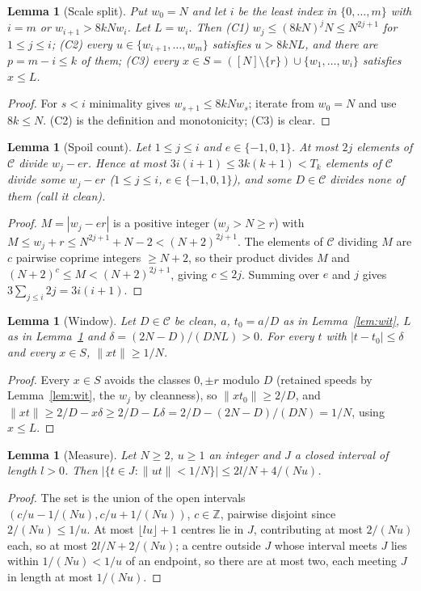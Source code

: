 \documentclass[11pt]{article}
\newtheorem{lemma}[theorem]{Lemma}
\theoremstyle{definition}
\theoremstyle{remark}
\newcommand{\nd}[1]{\lVert #1\rVert}
\newcommand{\ZZ}{\mathbb{Z}}
\begin{document}
\begin{lemma}[Scale split]\label{lem:C}
Put $w_0=N$ and let $i$ be the least index in $\{0,\dots,m\}$ with $i=m$ or $w_{i+1}>8kNw_i$. Let $L=w_i$. Then (C1) $w_j\le(8kN)^jN\le N^{2j+1}$ for $1\le j\le i$; (C2) every $u\in\{w_{i+1},\dots,w_m\}$ satisfies $u>8kNL$, and there are $p=m-i\le k$ of them; (C3) every $x\in S=([N]\setminus\{r\})\cup\{w_1,\dots,w_i\}$ satisfies $x\le L$.
\end{lemma}
\begin{proof}
For $s<i$ minimality gives $w_{s+1}\le8kNw_s$; iterate from $w_0=N$ and use $8k\le N$. (C2) is the definition and monotonicity; (C3) is clear.
\end{proof}

\begin{lemma}[Spoil count]\label{lem:S}
Let $1\le j\le i$ and $e\in\{-1,0,1\}$. At most $2j$ elements of $\mathcal C$ divide $w_j-er$. Hence at most $3i(i+1)\le3k(k+1)<T_k$ elements of $\mathcal C$ divide some $w_j-er$ ($1\le j\le i$, $e\in\{-1,0,1\}$), and some $D\in\mathcal C$ divides none of them (call it \emph{clean}).
\end{lemma}
\begin{proof}
$M=|w_j-er|$ is a positive integer ($w_j>N\ge r$) with $M\le w_j+r\le N^{2j+1}+N-2<(N+2)^{2j+1}$. The elements of $\mathcal C$ dividing $M$ are $c$ pairwise coprime integers $\ge N+2$, so their product divides $M$ and $(N+2)^c\le M<(N+2)^{2j+1}$, giving $c\le2j$. Summing over $e$ and $j$ gives $3\sum_{j\le i}2j=3i(i+1)$.
\end{proof}

\begin{lemma}[Window]\label{lem:lip}
Let $D\in\mathcal C$ be clean, $a$, $t_0=a/D$ as in Lemma~\ref{lem:wit}, $L$ as in Lemma~\ref{lem:C} and $\delta=(2N-D)/(DNL)>0$. For every $t$ with $|t-t_0|\le\delta$ and every $x\in S$, $\nd{xt}\ge1/N$.
\end{lemma}
\begin{proof}
Every $x\in S$ avoids the classes $0,\pm r$ modulo $D$ (retained speeds by Lemma~\ref{lem:wit}, the $w_j$ by cleanness), so $\nd{xt_0}\ge2/D$, and $\nd{xt}\ge2/D-x\delta\ge2/D-L\delta=2/D-(2N-D)/(DN)=1/N$, using $x\le L$.
\end{proof}

\begin{lemma}[Measure]\label{lem:M}
Let $N\ge2$, $u\ge1$ an integer and $J$ a closed interval of length $l>0$. Then $|\{t\in J:\nd{ut}<1/N\}|\le2l/N+4/(Nu)$.
\end{lemma}
\begin{proof}
The set is the union of the open intervals $(c/u-1/(Nu),c/u+1/(Nu))$, $c\in\ZZ$, pairwise disjoint since $2/(Nu)\le1/u$. At most $\lfloor lu\rfloor+1$ centres lie in $J$, contributing at most $2/(Nu)$ each, so at most $2l/N+2/(Nu)$; a centre outside $J$ whose interval meets $J$ lies within $1/(Nu)<1/u$ of an endpoint, so there are at most two, each meeting $J$ in length at most $1/(Nu)$.
\end{proof}
\end{document}
